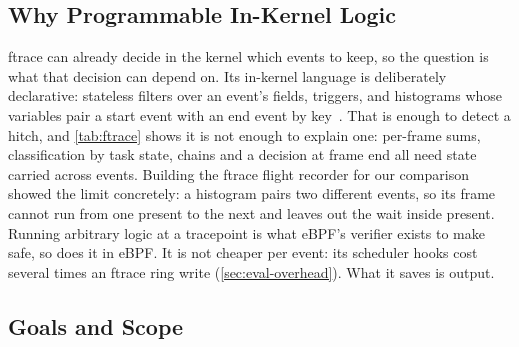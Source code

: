 \begin{table}[t]
\centering
\footnotesize

\caption{Approaches against the shortcomings of \autoref{sec:challenges}.
\emph{Rare hitches attributed}: injected hitches whose cause the output
names without further analysis (\autoref{sec:eval-catch}); ``--'': raw
events, not scored; the whole-run summary is scored by the rank of the
cause's heaviest line. \sys tells stalls from normal waits only in part
(\autoref{sec:limitations}).}
\label{tab:compare}
\end{table}

\subsection{Why Programmable In-Kernel Logic}
\label{sec:ftrace}

ftrace can already decide in the kernel which events to keep, so the
question is what that decision can depend on. Its in-kernel language is
deliberately declarative: stateless filters over an event's fields,
triggers, and histograms whose variables pair a start event with an end
event by key~\cite{ftracehist}. That is enough to detect a hitch, and
\autoref{tab:ftrace} shows it is not enough to explain one: per-frame sums,
classification by task state, chains and a decision at frame end all need
state carried across events. Building the ftrace flight recorder for our
comparison showed the limit concretely: a histogram pairs two different
events, so its frame cannot run from one present to the next and leaves out
the wait inside present. Running arbitrary logic at a tracepoint is what
eBPF's verifier exists to make safe, so \sys does it in eBPF. It is not
cheaper per event: its scheduler hooks cost several times an ftrace ring
write (\autoref{sec:eval-overhead}). What it saves is output.

\begin{table}[t]
\centering
\small

\caption{Parts of frame attribution expressible in ftrace's in-kernel
filter/trigger/histogram language. $^\dagger$Histogram variables pair two
events by key; a running sum reset by a third event is outside the documented
model . $^\ddagger$Only whole-buffer snapshots.}
\label{tab:ftrace}
\end{table}

\subsection{Goals and Scope}
\label{sec:scope}

